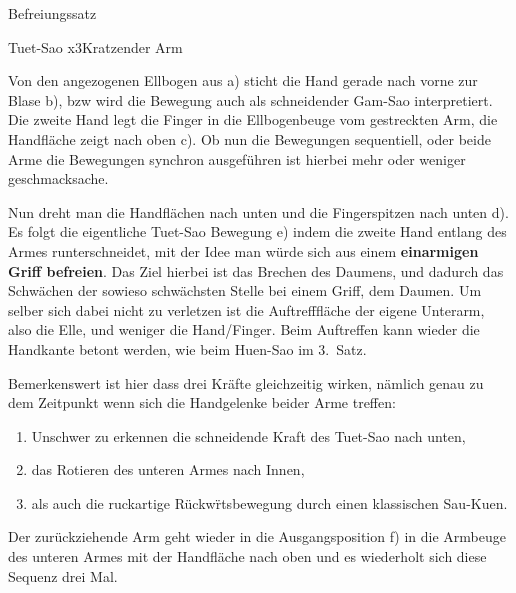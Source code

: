 
\begin{WTSatz}{Befreiungssatz}%

	
	\begin{WTSatzTeil}{Tuet-Sao x3}{Kratzender Arm}
		
		
		Von den angezogenen Ellbogen aus a) sticht die Hand gerade nach vorne zur Blase b), bzw wird die Bewegung auch als schneidender Gam-Sao interpretiert. Die zweite Hand legt die Finger in die Ellbogenbeuge vom gestreckten Arm, die Handfl\"ache zeigt nach oben c). Ob nun die Bewegungen sequentiell, oder beide Arme die Bewegungen synchron ausgef\"uhren ist hierbei mehr oder weniger geschmacksache.
				
		
		Nun dreht man die Handfl\"achen nach unten und die Fingerspitzen nach unten d). Es folgt die eigentliche Tuet-Sao Bewegung e) indem die zweite Hand entlang des Armes runterschneidet, mit der Idee man w\"urde sich aus einem \textbf{einarmigen Griff befreien}. Das Ziel hierbei ist das Brechen des Daumens, und dadurch das Schw\"achen der sowieso schw\"achsten Stelle bei einem Griff, dem Daumen. Um selber sich dabei nicht zu verletzen ist die Auftrefffl\"ache der eigene Unterarm, also die Elle, und weniger die Hand/Finger. Beim Auftreffen kann wieder die Handkante betont werden, wie beim Huen-Sao im 3.~Satz.
		
		Bemerkenswert ist hier dass drei Kr\"afte gleichzeitig wirken, n\"amlich genau zu dem Zeitpunkt wenn sich die Handgelenke beider Arme treffen:
		\begin{enumerate}
			\item Unschwer zu erkennen die schneidende Kraft des Tuet-Sao nach unten,
			\item das Rotieren des unteren Armes nach Innen,
			\item als auch die ruckartige R\"uckw\"rtsbewegung durch einen klassischen Sau-Kuen.
		\end{enumerate}
		
		Der zur\"uckziehende Arm geht wieder in die Ausgangsposition f) in die Armbeuge des unteren Armes mit der Handfl\"ache nach oben und es wiederholt sich diese Sequenz drei Mal.


\end{WTSatzTeil}
\end{WTSatz}
